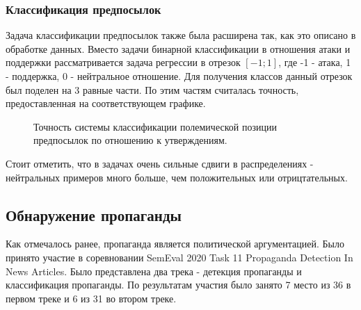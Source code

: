 \subsubsection{Классификация предпосылок}
Задача классификации предпосылок также была расширена так, как это описано в обработке данных. Вместо задачи бинарной классификации в отношения атаки и поддержки рассматривается задача регрессии в отрезок $[-1; 1]$, где -1 - атака, 1 - поддержка, 0 - нейтральное отношение. Для получения классов данный отрезок был поделен на 3 равные части. По этим частям считалась точность, предоставленная на соответствующем графике.

\begin{figure}[H]
 \caption{Точность системы классификации полемической позиции предпосылок по отношению к утверждениям.}
\end{figure}

Стоит отметить, что в задачах очень сильные сдвиги в распределениях - нейтральных примеров много больше, чем положительных или отрицтательных.

\subsection{Обнаружение пропаганды}

Как отмечалось ранее, пропаганда является политической аргументацией. Было принято участие в соревновании  SemEval 2020 Task 11 Propaganda Detection In News Articles\cite{da2020semeval}. Было представлена два трека - детекция пропаганды и классификация пропаганды. По результатам\cite{dimov-etal-2020-nopropaganda} участия было занято 7 место из 36 в первом треке и 6 из 31 во втором треке.

